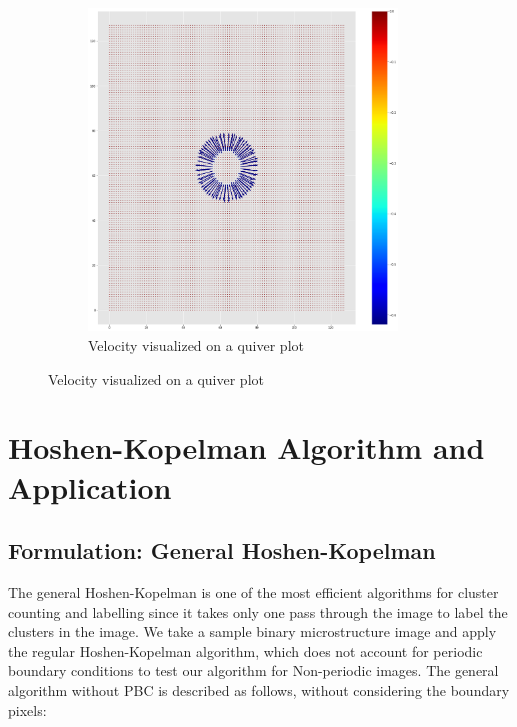 \documentclass[12pt, a4paper]{report}
\begin{document}
\begin{figure}[H]
\centering
\begin{subfigure}{.6\textwidth}
  \centering
  \includegraphics[width=0.9\textwidth]{Pictures/Level Set/level_set_velocity.png}
  \caption{Velocity visualized on a quiver plot}
  \label{img:microstrImg}
\end{subfigure}
\label{fig:test}
\end{figure}


\chapter{Hoshen-Kopelman Algorithm and Application}

\section{Formulation: General Hoshen-Kopelman}

The general Hoshen-Kopelman is one of the most efficient algorithms for cluster counting and labelling since it takes only one pass through the image to label the clusters in the image. We take a sample binary microstructure image and apply the regular Hoshen-Kopelman algorithm, which does not account for periodic boundary conditions to test our algorithm for Non-periodic images. The general algorithm without PBC is described as follows, without considering the boundary pixels:
\end{document}
